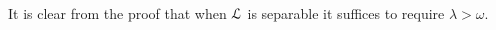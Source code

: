 \documentclass[10pt,oneside]{amsproc}
\newcommand{\mylabel}[1]{{#1}\hfill}
\renewenvironment{itemize}
  {\begin{list}{$\cdot$}{%
  \setlength{\parskip}{0mm}
  \setlength{\topsep}{.4\baselineskip}
  \setlength{\rightmargin}{0mm}
  \setlength{\listparindent}{0mm}
  \setlength{\itemindent}{0mm}
  \setlength{\labelwidth}{3ex}
  \setlength{\itemsep}{.2\baselineskip}
  \setlength{\parsep}{.2\baselineskip}
  \setlength{\partopsep}{0mm}
  \setlength{\labelsep}{1ex}
  \setlength{\leftmargin}{\labelwidth+\labelsep}
  \let\makelabel\mylabel}}{%
\end{list}}
\renewcommand*{\emph}[1]{%
   \smash{\tikz[baseline]\node[rectangle, fill=teal!25, rounded corners, inner xsep=0.5ex, inner ysep=0.2ex, anchor=base, minimum height = 2.7ex]{\strut #1};}}
\begin{document}
It is clear from the proof that when ${\EuScript L}$ is separable it suffices to require $\lambda>\omega$.

\begin{comment}
  
We say that the set $B$ is a \emph{Cauchy closure\/} of $A$ if 
\begin{itemize}
  \item[1.] every ${\sf I}$-invariant Cauchy type $p(x)\subseteq{\EuScript I}(A)$ is realized in $B$
  \item[2.] ${\EuScript I}\mbox{-tp}(b/A)$ is Cauchy for every $b\in B$.
\end{itemize}

\begin{proposition}\label{prop_Cauchyclosure}
  Assume $L_{\sf H}$ is a functional language.
  Let $M$ be model.
  Then any Cauchy closure of $M$ is a model.
\end{proposition}

\begin{proof} ???
\end{proof}
  {\color{blue}
  (messy/wrong/incomplete)
  We need a few easy observations.
  Let $a\sim_{\sf I}a'$ be finite tuples.
  Let $\langle a\rangle$ be the $L_{\sf H}$ substructure of $U$ generated by $a$.
  Then for every $b\in U\smallsetminus\langle a\rangle$ there is a $b'\in U\smallsetminus\langle a'\rangle$ such that $a,b\sim_{\sf I}a',b'$.
  In fact, $\sim_{\sf I}$-classes are infinite, hence they ave the cardinality of $U$.
  Therefore, by back-and-forth, $a\equiv a'$.
  We also have that for every formula $\varphi(x,z)$ and $b\in U\smallsetminus\big(\langle a\rangle\cup\big)$ 

  \ceq{}{~}{\forallH x\notin{\rm rng}(a,a')\big[\varphi(x,a)\leftrightarrow\varphi(x,a')\big].}

  Let $N$ be a Cauchy closure of $M$.
  We verify that $N$ satisfies (2) of Proposition~\ref{prop_Tarski_Vaught}.
  Let $\varphi(x,z)\in{\EuScript H}$ and $a\in N^{|z|}$ be be such that $\existsH x\ \varphi(x,a)$.
  We can assume that $a$ is a tuple of distinct elements.
  By the observations above
  
  \ceq{\hfill a\sim_{\sf I}z}{\rightarrow}{\forallH x\notin{\rm rng}(a,z)\big[\varphi(x,a)\leftrightarrow\varphi(x,z)\big]}

  By compactness,

  \ceq{\hfill a\sim_{t,D}z}{\rightarrow}{\forallH x\notin{\rm rng}(a,z)\big[\varphi'(x,a)\leftrightarrow\varphi'(x,z)\big]}


\end{comment}
\end{document}
